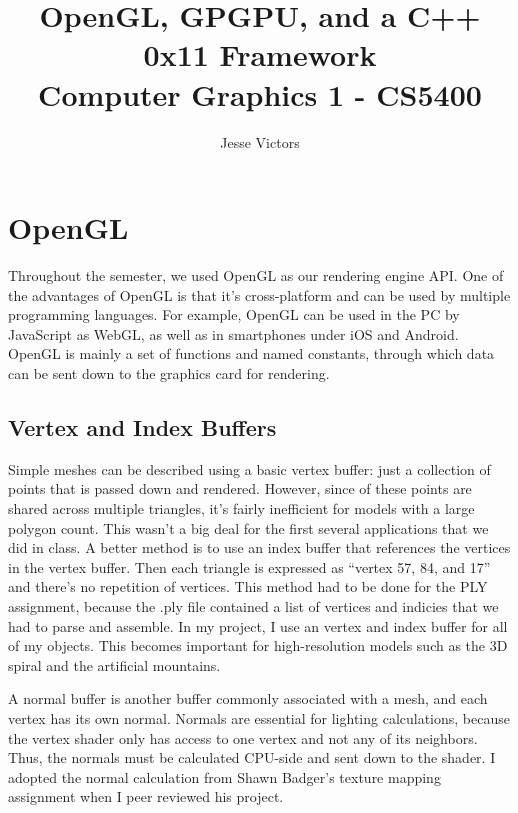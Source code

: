 \documentclass[journal]{IEEEtran}
\begin{document}
\title{OpenGL, GPGPU, and a C++ 0x11 Framework \\ \Large Computer Graphics 1 - CS5400}
\author{Jesse Victors}

\maketitle

\section{OpenGL}

Throughout the semester, we used OpenGL as our rendering engine API. One of the advantages of OpenGL is that it's cross-platform and can be used by multiple programming languages. For example, OpenGL can be used in the PC by JavaScript as WebGL, as well as in smartphones under iOS and Android. OpenGL is mainly a set of functions and named constants, through which data can be sent down to the graphics card for rendering.

\subsection{Vertex and Index Buffers}

Simple meshes can be described using a basic vertex buffer: just a collection of points that is passed down and rendered. However, since of these points are shared across multiple triangles, it's fairly inefficient for models with a large polygon count. This wasn't a big deal for the first several applications that we did in class. A better method is to use an index buffer that references the vertices in the vertex buffer. Then each triangle is expressed as ``vertex 57, 84, and 17'' and there's no repetition of vertices. This method had to be done for the PLY assignment, because the .ply file contained a list of vertices and indicies that we had to parse and assemble. In my project, I use an vertex and index buffer for all of my objects. This becomes important for high-resolution models such as the 3D spiral and the artificial mountains.

A normal buffer is another buffer commonly associated with a mesh, and each vertex has its own normal. Normals are essential for lighting calculations, because the vertex shader only has access to one vertex and not any of its neighbors. Thus, the normals must be calculated CPU-side and sent down to the shader. I adopted the normal calculation from Shawn Badger's texture mapping assignment when I peer reviewed his project.
\end{document}
